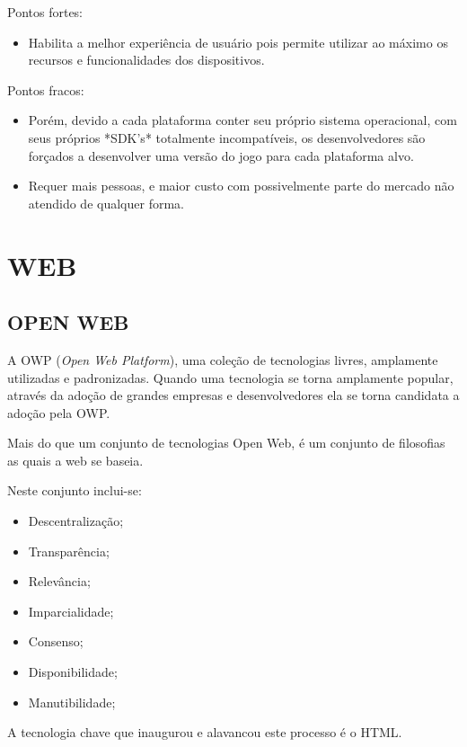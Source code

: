 \documentclass[
12pt,
a4paper,
portuges,
draft
]{report}
\begin{document}
Pontos fortes:
\begin{itemize}
\item Habilita a melhor experiência de usuário pois permite utilizar ao
máximo os recursos e funcionalidades dos dispositivos.
\end{itemize}

Pontos fracos:
\begin{itemize}
\item Porém, devido a cada plataforma conter seu próprio sistema operacional,
com seus próprios *SDK's* totalmente incompatíveis, os desenvolvedores são
forçados a desenvolver uma versão do jogo para cada plataforma alvo.
\item Requer mais pessoas, e maior custo com possivelmente parte do mercado não atendido de qualquer forma.
\end{itemize}


\section{WEB}

\subsection{OPEN WEB}

A OWP (\textit{Open Web Platform}), uma coleção de tecnologias livres,
amplamente utilizadas e padronizadas.
Quando uma tecnologia se torna amplamente popular, através da
adoção de grandes empresas e desenvolvedores ela se torna candidata a
adoção pela OWP.

Mais do que um conjunto de tecnologias Open Web, é um conjunto de
filosofias as quais a web se baseia.

Neste conjunto inclui-se:

\begin{itemize}
\item Descentralização;
\item Transparência;
\item Relevância;
\item Imparcialidade;
\item Consenso;
\item Disponibilidade;
\item Manutibilidade;
\end{itemize}

A tecnologia chave que inaugurou e alavancou este processo é o HTML.
\end{document}
